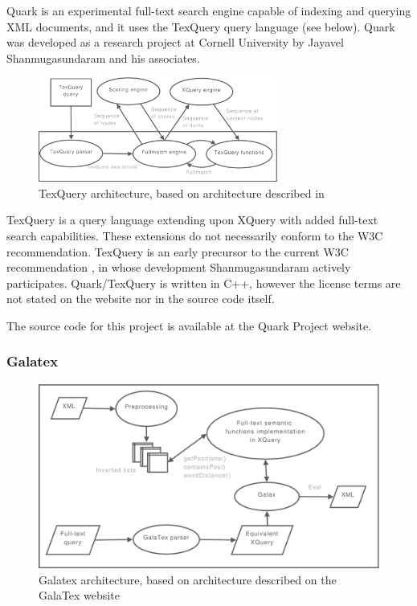 Quark is an experimental full-text search engine capable of indexing and
querying XML documents, and it uses the TexQuery query language (see below). 
Quark was developed as a research project at Cornell University by Jayavel 
Shanmugasundaram and his associates.

\begin{figure}[!h]
  \centering
    \includegraphics[width=0.7\textwidth]{diagrams/texquery_arch}
  \caption[TexQuery architecture]{TexQuery architecture, based on architecture described in
  \cite{texquery_fulltextsearch}}
\end{figure}

TexQuery is a query language extending upon XQuery with added full-text search 
capabilities. These extensions do not necessarily conform to the W3C
recommendation. TexQuery is an early precursor to the current W3C 
recommendation \cite{TEXQ00}, in whose development Shanmugasundaram actively 
participates. Quark/TexQuery is written in C++, however the license terms are
not stated on the website nor in the source code itself.

The source code for this project is available at the Quark Project
website\cite{quarkproject}.

\subsubsection{Galatex}
\begin{figure}[!h]
  \centering
    \includegraphics[width=1\textwidth]{diagrams/galatex_arch}
  \caption[GalaTex architecture]{Galatex architecture, based on architecture described on
  the GalaTex website\cite{galatex}}
  \label{figure:galatex:arch}
\end{figure}

